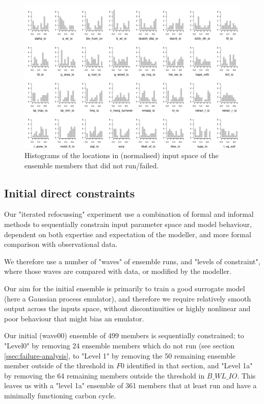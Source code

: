 \documentclass[gmd, manuscript]{copernicus}
\begin{document}
\begin{figure}[t]
\includegraphics[width=12cm]{./graphics/run-failure-hists.pdf}
\caption{Histograms of the locations in (normalised) input space of the ensemble members that did not run/failed.}
\end{figure}


\subsection{Initial direct constraints}

Our "iterated refocussing" experiment use a combination of formal and informal methods to sequentially constrain input parameter space and model behaviour, dependent on both expertise and expectation of the modeller, and more formal comparison with observational data.

We therefore use a number of "waves" of ensemble runs, and  "levels of constraint", where those waves are compared with data, or modified by the modeller. 

Our aim for the initial ensemble is primarily to train a good surrogate model (here a Gaussian process emulator), and therefore we require relatively smooth output across the inputs space, without discontinuities or highly nonlinear and poor behaviour that might bias an emulator.

Our initial (wave00) ensemble of 499 members is sequentially constrained; to "Level0" by removing 24 ensemble members which do not run (see section \ref{ssec:failure-analysis}, to "Level 1" by removing the 50 remaining ensemble member outside of the threshold in $F0$ identified in that section, and "Level 1a" by removing the 64 remaining members outside the threshold in $B\_WL\_IO$. This leaves us with a "level 1a" ensemble of 361 members that at least run and have a minimally functioning carbon cycle.
\end{document}
